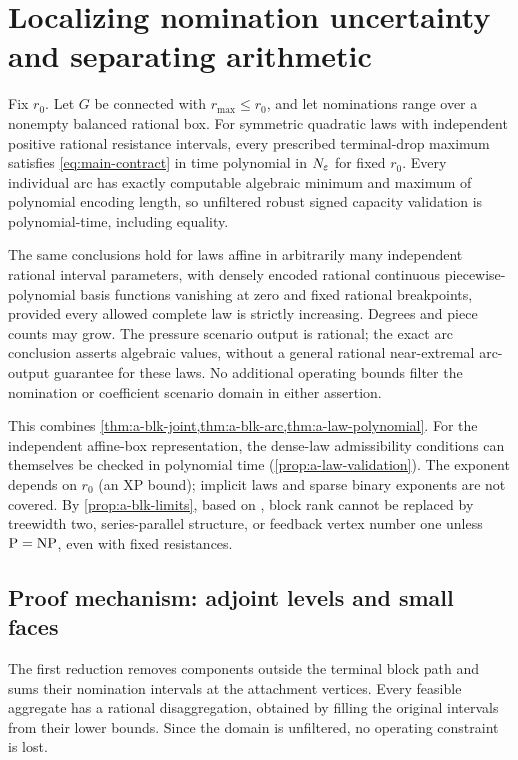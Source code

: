 \section{Localizing nomination uncertainty and separating arithmetic}
\label{sec:main-localization}

\begin{theorem}
\label{thm:main-block}
Fix $r_0$. Let $G$ be connected with $r_{\max}\le r_0$, and let
nominations range over a nonempty balanced rational box.
For symmetric quadratic laws with independent positive rational
resistance intervals, every prescribed terminal-drop maximum satisfies
\eqref{eq:main-contract} in time polynomial in $N_\varepsilon$ for fixed $r_0$.
Every individual arc has exactly computable algebraic minimum and
maximum of polynomial encoding length, so unfiltered robust signed
capacity validation is polynomial-time, including equality.

The same conclusions hold for laws affine in arbitrarily many independent
rational interval parameters, with densely encoded rational continuous
piecewise-polynomial basis functions vanishing at zero and fixed rational
breakpoints, provided every allowed complete law is strictly increasing.
Degrees and piece counts may grow. The pressure scenario output is
rational; the exact arc conclusion asserts algebraic values, without a
general rational near-extremal arc-output guarantee for these laws.
No additional operating bounds filter the nomination or coefficient
scenario domain in either assertion.
\end{theorem}

This combines \cref{thm:a-blk-joint,thm:a-blk-arc,thm:a-law-polynomial}.
For the independent affine-box representation, the dense-law
admissibility conditions can themselves be checked in polynomial time
(\cref{prop:a-law-validation}). The exponent depends on $r_0$ (an XP
bound); implicit laws and sparse binary exponents are not covered. By
\cref{prop:a-blk-limits}, based on
\citet{thurauf2022-deciding-the-feasibility-of-a}, block rank cannot be
replaced by treewidth two, series-parallel structure, or feedback vertex
number one unless $\mathrm P=\mathrm{NP}$, even with fixed resistances.

\subsection{Proof mechanism: adjoint levels and small faces}

The first reduction removes components outside the terminal block path
and sums their nomination intervals at the attachment vertices. Every
feasible aggregate has a rational disaggregation, obtained by filling
the original intervals from their lower bounds. Since the domain is
unfiltered, no operating constraint is lost.

